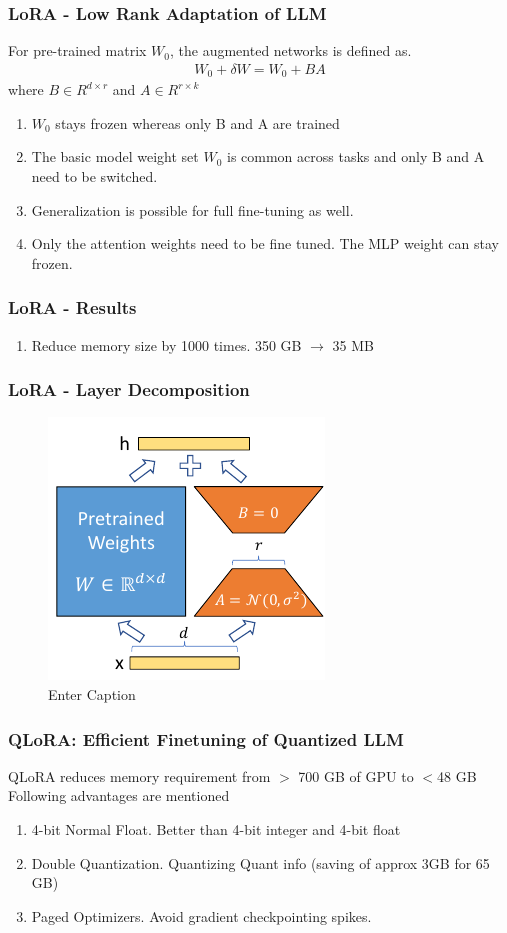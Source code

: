 \documentclass{beamer}
\theoremstyle{plain}
\theoremstyle{definition}
\theoremstyle{remark}
\numberwithin{equation}{section}
\numberwithin{figure}{section}
\numberwithin{theorem}{section}
\renewcommand{\to}{\longrightarrow}
\begin{document}
\begin{frame}[shrink]
\frametitle{LoRA - Low Rank Adaptation of LLM}
For pre-trained matrix $W_0$, the augmented networks is defined as.
\begin{align}
    W_0 + \delta W = W_0 + BA
\end{align}
where $B \in R^{d \times r}$ and $A\in R^{r\times k}$
\begin{enumerate}
\item $W_0$ stays frozen whereas only B and A are trained
\item The basic model weight set $W_0$ is common across tasks and only B and A need to be switched.
\item Generalization is possible for full fine-tuning as well.
\item Only the attention weights need to be fine tuned. The MLP weight can stay frozen.
\end{enumerate}
\end{frame}

\begin{frame}
\frametitle{LoRA - Results}
\begin{enumerate}
    \item Reduce memory size by 1000 times. 350 GB $\to$ 35 MB
\end{enumerate}
\end{frame}


\begin{frame}
\frametitle{LoRA - Layer Decomposition}
\begin{figure}
    \centering
    \includegraphics[width=0.5\linewidth]{lora.png}
    \caption{Enter Caption}
    \label{fig:enter-label}
\end{figure}
\end{frame}


\begin{frame}
\frametitle{QLoRA: Efficient Finetuning of Quantized LLM}
QLoRA reduces memory requirement from $>$ 700 GB of GPU to $<$48 GB
Following advantages are mentioned
\begin{enumerate}
    \item 4-bit Normal Float. Better than 4-bit integer and 4-bit float
    \item Double Quantization. Quantizing Quant info (saving of approx 3GB for 65 GB)
    \item Paged Optimizers. Avoid gradient checkpointing spikes.
\end{enumerate}
\end{frame}
\end{document}
